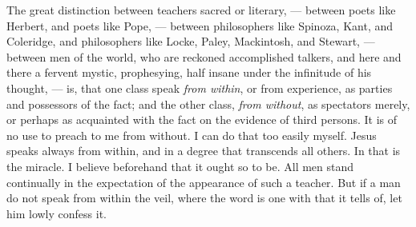 \documentclass{article}
\begin{document}
The great distinction between teachers sacred or literary, --- between poets like Herbert, and poets like Pope, --- between philosophers like Spinoza, Kant, and Coleridge, and philosophers like Locke, Paley, Mackintosh, and Stewart, --- between men of the world, who are reckoned accomplished talkers, and here and there a fervent mystic, prophesying, half insane under the infinitude of his thought, --- is, that one class speak \emph{from within}, or from experience, as parties and possessors of the fact; and the other class, \emph{from without}, as spectators merely, or perhaps as acquainted with the fact on the evidence of third persons. It is of no use to preach to me from without. I can do that too easily myself. Jesus speaks always from within, and in a degree that transcends all others. In that is the miracle. I believe beforehand that it ought so to be. All men stand continually in the expectation of the appearance of such a teacher. But if a man do not speak from within the veil, where the word is one with that it tells of, let him lowly confess it.
\end{document}
